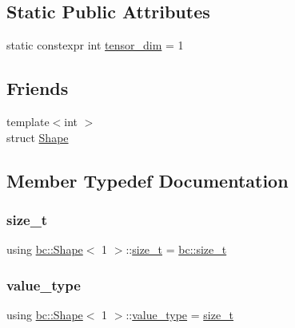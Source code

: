 \subsection*{Static Public Attributes}
\begin{DoxyCompactItemize}
\item 
static constexpr int \hyperlink{structbc_1_1Shape_3_011_01_4_ac2fac44ccf0120b2179e58fde3386678}{tensor\+\_\+dim} = 1
\end{DoxyCompactItemize}
\subsection*{Friends}
\begin{DoxyCompactItemize}
\item 
{\footnotesize template$<$int $>$ }\\struct \hyperlink{structbc_1_1Shape_3_011_01_4_ab0bde87b11c5c08fec2f2325317820de}{Shape}
\end{DoxyCompactItemize}


\subsection{Member Typedef Documentation}
\mbox{\label{structbc_1_1Shape_3_011_01_4_a7ab1c3926651c49d726655dbaa5dc0a3}} 
\subsubsection{\texorpdfstring{size\+\_\+t}{size\_t}}
{\footnotesize\ttfamily using \hyperlink{structbc_1_1Shape}{bc\+::\+Shape}$<$ 1 $>$\+::\hyperlink{structbc_1_1Shape_3_011_01_4_a7ab1c3926651c49d726655dbaa5dc0a3}{size\+\_\+t} =  \hyperlink{namespacebc_aaf8e3fbf99b04b1b57c4f80c6f55d3c5}{bc\+::size\+\_\+t}}

\mbox{\label{structbc_1_1Shape_3_011_01_4_af66534aceeff2fe3a7114d6ee031065a}} 
\subsubsection{\texorpdfstring{value\+\_\+type}{value\_type}}
{\footnotesize\ttfamily using \hyperlink{structbc_1_1Shape}{bc\+::\+Shape}$<$ 1 $>$\+::\hyperlink{structbc_1_1Shape_3_011_01_4_af66534aceeff2fe3a7114d6ee031065a}{value\+\_\+type} =  \hyperlink{structbc_1_1Shape_3_011_01_4_a7ab1c3926651c49d726655dbaa5dc0a3}{size\+\_\+t}}



